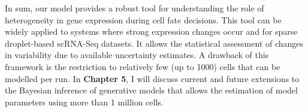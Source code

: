 In sum, our model provides a robust tool for understanding the role of heterogeneity in gene expression during cell fate decisions. 
This tool can be widely applied to systems where strong expression changes occur and for sparse droplet-based scRNA-Seq datasets. 
It allows the statistical assessment of changes in variability due to available uncertainty estimates. 
A drawback of this framework is the restriction to relatively few (up to 1000) cells that can be modelled per run. 
In \textbf{Chapter 5}, I will discuss current and future extensions to the Bayesian inference of generative models that allows the estimation of model parameters using more than 1 million cells.


